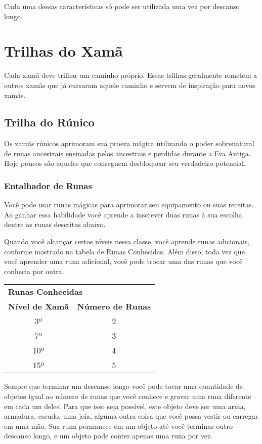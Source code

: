 \begin{multicols}{2}
Cada uma dessas características só pode ser utilizada uma vez por descanso
longo.

\section*{Trilhas do Xamã}%

Cada xamã deve trilhar um caminho próprio. Essas trilhas geralmente remetem a
outros xamãs que já cursaram aquele caminho e servem de inspiração para novos
xamãs.

\subsection*{Trilha do Rúnico}%

Os xamãs rúnicos aprimoram sua proeza mágica utilizando o poder sobrenatural de
runas ancestrais ensinadas pelos ancestrais e perdidas durante a Era Antiga.
Hoje poucos são aqueles que conseguem desbloquear seu verdadeiro potencial.

\subsubsection*{Entalhador de Runas}%

Você pode usar runas mágicas para aprimorar seu equipamento ou suas receitas. Ao
ganhar essa habilidade você aprende a inscrever duas runas à sua escolha dentre
as runas descritas abaixo.

Quando você alcançar certos níveis nessa classe, você aprende runas adicionais,
conforme mostrado na tabela de Runas Conhecidas. Além disso, toda vez que você
aprender uma runa adicional, você pode trocar uma das runas que você conhecia
por outra.

\begin{tabular}{c c}
\multicolumn{2}{l}{\textbf{\Large Runas Conhecidas}} \\
\textbf{Nível de Xamã} & \textbf{Número de Runas} \\
3º & 2 \\
7º & 3 \\
10º & 4 \\
15º & 5 \\
\end{tabular}

Sempre que terminar um descanso longo você pode tocar uma quantidade de objetos
igual ao número de runas que você conhece e gravar uma runa diferente em cada um
deles. Para que isso seja possível, este objeto deve ser uma arma, armadura,
escudo, uma joia, alguma outra coisa que você possa vestir ou carregar em uma
mão. Sua runa permanece em um objeto até você terminar outro descanso longo, e
um objeto pode conter apenas uma runa por vez.


\end{multicols}
